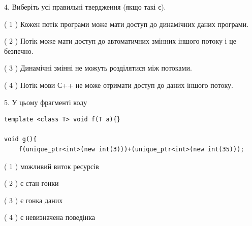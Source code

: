 \documentclass[12pt, ukrainian]{article}
\begin{document}
\begin {large}
{%
4. Виберіть усі правильні твердження (якщо такі є).\par
\vspace{2mm}

( 1 ) Кожен потік програми може мати доступ до динамічних даних програми.%

( 2 ) Потік може мати доступ до автоматичних змінних іншого потоку і це безпечно.%

( 3 ) Динамічні змінні не можуть розділятися між потоками.%

( 4 ) Потік мови С++ не може отримати доступ до даних іншого потоку.%


5. У цьому фрагменті коду
\begin{verbatim}
template <class T> void f(T a){}

void g(){
    f(unique_ptr<int>(new int(3)))+(unique_ptr<int>(new int(35)));
\end{verbatim}

( 1 ) можливий виток ресурсів%

( 2 ) є стан гонки%

( 3 ) є гонка даних%

( 4 ) є невизначена поведінка%
}
\end {large}
\end{document}

